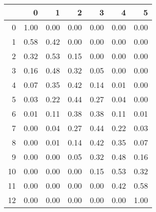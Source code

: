 \documentclass[11pt]{article}
\begin{document}
\begin{table}[ht]
\centering
\begin{tabular}{r|rrrrrr}
  \hline
 & 0 & 1 & 2 & 3 & 4 & 5 \\ 
  \hline
0 & 1.00 & 0.00 & 0.00 & 0.00 & 0.00 & 0.00 \\ 
  1 & 0.58 & 0.42 & 0.00 & 0.00 & 0.00 & 0.00 \\ 
  2 & 0.32 & 0.53 & 0.15 & 0.00 & 0.00 & 0.00 \\ 
  3 & 0.16 & 0.48 & 0.32 & 0.05 & 0.00 & 0.00 \\ 
  4 & 0.07 & 0.35 & 0.42 & 0.14 & 0.01 & 0.00 \\ 
  5 & 0.03 & 0.22 & 0.44 & 0.27 & 0.04 & 0.00 \\ 
  6 & 0.01 & 0.11 & 0.38 & 0.38 & 0.11 & 0.01 \\ 
  7 & 0.00 & 0.04 & 0.27 & 0.44 & 0.22 & 0.03 \\ 
  8 & 0.00 & 0.01 & 0.14 & 0.42 & 0.35 & 0.07 \\ 
  9 & 0.00 & 0.00 & 0.05 & 0.32 & 0.48 & 0.16 \\ 
  10 & 0.00 & 0.00 & 0.00 & 0.15 & 0.53 & 0.32 \\ 
  11 & 0.00 & 0.00 & 0.00 & 0.00 & 0.42 & 0.58 \\ 
  12 & 0.00 & 0.00 & 0.00 & 0.00 & 0.00 & 1.00 \\ 
   \hline
\end{tabular}
\end{table}
\end{document}
